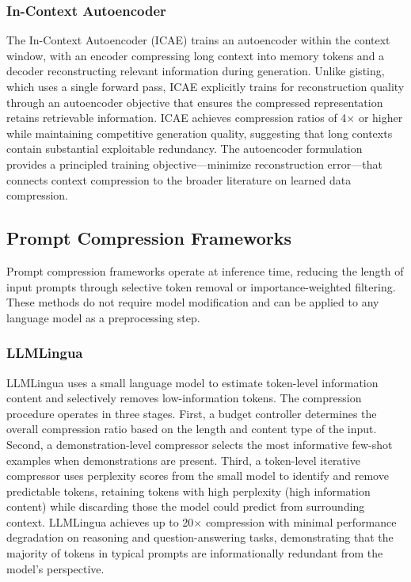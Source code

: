 \documentclass[11pt,letterpaper]{article}
\begin{document}
\subsubsection{In-Context Autoencoder}

The In-Context Autoencoder (ICAE) \cite{ge2024icae} trains an autoencoder within the context window, with an encoder compressing long context into memory tokens and a decoder reconstructing relevant information during generation. Unlike gisting, which uses a single forward pass, ICAE explicitly trains for reconstruction quality through an autoencoder objective that ensures the compressed representation retains retrievable information. ICAE achieves compression ratios of 4$\times$ or higher while maintaining competitive generation quality, suggesting that long contexts contain substantial exploitable redundancy. The autoencoder formulation provides a principled training objective---minimize reconstruction error---that connects context compression to the broader literature on learned data compression.

\subsection{Prompt Compression Frameworks}

Prompt compression frameworks operate at inference time, reducing the length of input prompts through selective token removal or importance-weighted filtering. These methods do not require model modification and can be applied to any language model as a preprocessing step.

\subsubsection{LLMLingua}

LLMLingua \cite{jiang2023llmlingua} uses a small language model to estimate token-level information content and selectively removes low-information tokens. The compression procedure operates in three stages. First, a budget controller determines the overall compression ratio based on the length and content type of the input. Second, a demonstration-level compressor selects the most informative few-shot examples when demonstrations are present. Third, a token-level iterative compressor uses perplexity scores from the small model to identify and remove predictable tokens, retaining tokens with high perplexity (high information content) while discarding those the model could predict from surrounding context. LLMLingua achieves up to 20$\times$ compression with minimal performance degradation on reasoning and question-answering tasks, demonstrating that the majority of tokens in typical prompts are informationally redundant from the model's perspective.
\end{document}
